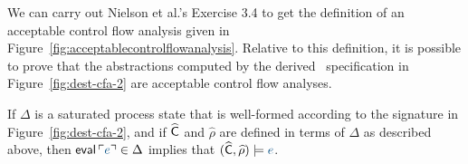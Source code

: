 We can carry out Nielson et al.'s Exercise 3.4 to get the definition
of an acceptable control flow analysis given in
Figure~\ref{fig:acceptablecontrolflowanalysis}. Relative to this
definition, it is possible to prove that the abstractions computed by
the derived \sls~specification in Figure~\ref{fig:dest-cfa-2} are
acceptable control flow analyses.

\bigskip
\begin{theorem}\label{thm:acceptablecfa}
If $\Delta$ is a saturated process state that is well-formed according to
the signature in Figure~\ref{fig:dest-cfa-2}, and if $\widehat{\sf C}$
and $\widehat{\rho}$ are defined in terms of $\Delta$ as described above,
then ${\sf eval}\,\interp{e} \in \Delta$ implies
that $(\widehat{\sf C}, \widehat{\rho}) \models \obj{e}$. 
\end{theorem}


